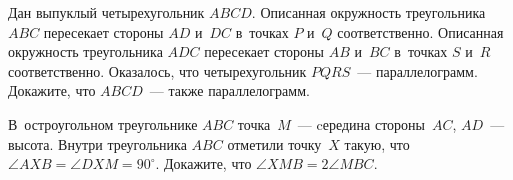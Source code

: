 \begin{problems}
\item
Дан выпуклый четырехугольник $ABCD$.
Описанная окружность треугольника $ABC$ пересекает стороны $AD$ и~$DC$
в~точках $P$ и~$Q$ соответственно.
Описанная окружность треугольника $ADC$ пересекает стороны $AB$ и~$BC$
в~точках $S$ и~$R$ соответственно.
Оказалось, что четырехугольник $PQRS$~--- параллелограмм.
Докажите, что $ABCD$~--- также параллелограмм.

\item
В~остроугольном треугольнике $ABC$ точка~$M$~--- cередина стороны~$AC$,
$AD$~--- высота.
Внутри треугольника $ABC$ отметили точку~$X$ такую, что
$\angle AXB = \angle DXM = 90^{\circ}$.
Докажите, что $\angle XMB = 2 \angle MBC$.

\end{problems}

